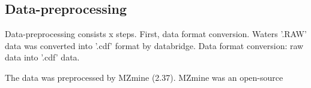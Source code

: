 \subsection{Data-preprocessing}
Data-preprocessing consists x steps.
First, data format conversion. Waters '.RAW' data was converted into '.cdf' format by databridge.
Data format conversion: 
raw data into '.cdf' data.

The data was preprocessed by MZmine (2.37). MZmine was an open-source 